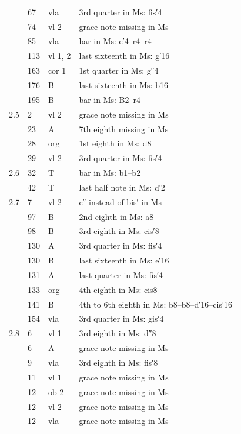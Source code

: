 \documentclass[parskip=full]{scrreprt}
\begin{document}
\begin{longtable}{lll L{10cm}}
       & 67  & vla     & 3rd quarter in Ms: fis′4 \\
       & 74  & vl 2    & grace note missing in Ms \\
       & 85  & vla     & bar in Ms: e′4–r4–r4 \\
       & 113 & vl 1, 2 & last sixteenth in Ms: g′16 \\
       & 163 & cor 1   & 1st quarter in Ms: g″4 \\
       & 176 & B       & last sixteenth in Ms: b16 \\
       & 195 & B       & bar in Ms: B2–r4 \\
  2.5  & 2   & vl 2    & grace note missing in Ms \\
       & 23  & A       & 7th eighth missing in Ms \\
       & 28  & org     & 1st eighth in Ms: d8 \\
       & 29  & vl 2    & 3rd quarter in Ms: fis′4 \\
  2.6  & 32  & T       & bar in Ms: b1–b2 \\
       & 42  & T       & last half note in Ms: d′2 \\
  2.7  &  7  & vl 2    & c″ instead of bis′ in Ms \\
       & 97  & B       & 2nd eighth in Ms: a8 \\
       & 98  & B       & 3rd eighth in Ms: cis′8 \\
       & 130 & A       & 3rd quarter in Ms: fis′4 \\
       & 130 & B       & last sixteenth in Ms: e′16 \\
       & 131 & A       & last quarter in Ms: fis′4 \\
       & 133 & org     & 4th eighth in Ms: cis8 \\
       & 141 & B       & 4th to 6th eighth in Ms: b8–b8–d′16–cis′16 \\
       & 154 & vla     & 3rd quarter in Ms: gis′4 \\
  2.8  & 6   & vl 1    & 3rd eighth in Ms: d″8 \\
       & 6   & A       & grace note missing in Ms \\
       & 9   & vla     & 3rd eighth in Ms: fis′8 \\
       & 11  & vl 1    & grace note missing in Ms \\
       & 12  & ob 2    & grace note missing in Ms \\
       & 12  & vl 2    & grace note missing in Ms \\
       & 12  & vla     & grace note missing in Ms \\

\end{longtable}
\end{document}
